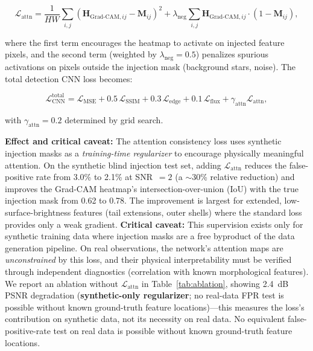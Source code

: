 \documentclass[usenatbib]{mnras}
\begin{document}
\begin{equation}\label{eq:attn_loss}
\mathcal{L}_{\text{attn}} = \frac{1}{HW} \sum_{i,j} \left(\mathbf{H}_{\text{Grad-CAM}, ij} - \mathbf{M}_{ij}\right)^2 + \lambda_{\text{neg}} \sum_{i,j} \mathbf{H}_{\text{Grad-CAM}, ij} \cdot (1 - \mathbf{M}_{ij}),
\end{equation}

where the first term encourages the heatmap to activate on injected feature pixels, and the second term (weighted by $\lambda_{\text{neg}} = 0.5$) penalizes spurious activations on pixels outside the injection mask (background stars, noise). The total detection CNN loss becomes:

\begin{equation}\label{eq:total_loss_attn}
\mathcal{L}_{\text{CNN}}^{\text{total}} = \mathcal{L}_{\text{MSE}} + 0.5\,\mathcal{L}_{\text{SSIM}} + 0.3\,\mathcal{L}_{\text{edge}} + 0.1\,\mathcal{L}_{\text{flux}} + \gamma_{\text{attn}} \mathcal{L}_{\text{attn}},
\end{equation}

with $\gamma_{\text{attn}} = 0.2$ determined by grid search.

\textbf{Effect and critical caveat:} The attention consistency loss uses synthetic injection masks as a \textit{training-time regularizer} to encourage physically meaningful attention. On the synthetic blind injection test set, adding $\mathcal{L}_{\text{attn}}$ reduces the false-positive rate from 3.0\% to 2.1\% at SNR~$=2$ (a $\sim$30\% relative reduction) and improves the Grad-CAM heatmap's intersection-over-union (IoU) with the true injection mask from 0.62 to 0.78. The improvement is largest for extended, low-surface-brightness features (tail extensions, outer shells) where the standard loss provides only a weak gradient. \textbf{Critical caveat:} This supervision exists only for synthetic training data where injection masks are a free byproduct of the data generation pipeline. On real observations, the network's attention maps are \textit{unconstrained} by this loss, and their physical interpretability must be verified through independent diagnostics (correlation with known morphological features). We report an ablation without $\mathcal{L}_{\mathrm{attn}}$ in Table~\ref{tab:ablation}, showing 2.4~dB PSNR degradation (\textbf{synthetic-only regularizer}; no real-data FPR test is possible without known ground-truth feature locations)---this measures the loss's contribution on synthetic data, not its necessity on real data. No equivalent false-positive-rate test on real data is possible without known ground-truth feature locations.
\end{document}
